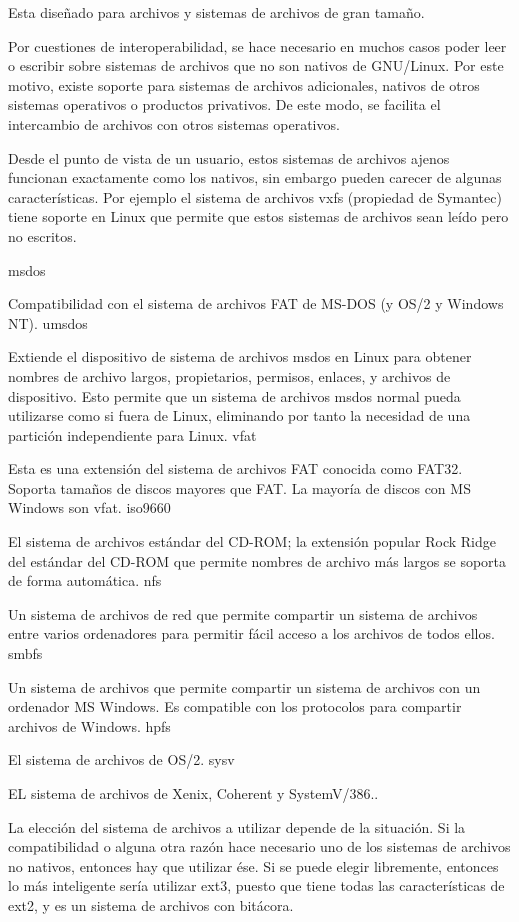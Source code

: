 \documentclass[12pt]{article}
\begin{document}
Esta diseñado para archivos y sistemas de archivos de gran tamaño.

Por cuestiones de interoperabilidad, se hace necesario en muchos casos
poder leer o escribir sobre sistemas de archivos que no son nativos de 
GNU/Linux. Por este motivo, existe soporte para sistemas de archivos 
adicionales, nativos de otros sistemas operativos o productos privativos. 
De este modo, se facilita el intercambio de archivos con otros sistemas 
operativos. 

Desde el punto de vista de un usuario, estos sistemas de archivos ajenos 
funcionan exactamente como los nativos, sin embargo pueden carecer de 
algunas características. Por ejemplo el sistema de archivos vxfs (propiedad
de Symantec) tiene soporte en Linux que permite que estos sistemas de 
archivos sean leído pero no escritos. 

msdos

    Compatibilidad con el sistema de archivos FAT de MS-DOS (y OS/2 y Windows NT).
umsdos

    Extiende el dispositivo de sistema de archivos msdos en Linux para obtener nombres de archivo largos, propietarios, permisos, enlaces, y archivos de dispositivo. Esto permite que un sistema de archivos msdos normal pueda utilizarse como si fuera de Linux, eliminando por tanto la necesidad de una partición independiente para Linux.
vfat

    Esta es una extensión del sistema de archivos FAT conocida como FAT32. Soporta tamaños de discos mayores que FAT. La mayoría de discos con MS Windows son vfat.
iso9660

    El sistema de archivos estándar del CD-ROM; la extensión popular Rock Ridge del estándar del CD-ROM que permite nombres de archivo más largos se soporta de forma automática.
nfs

    Un sistema de archivos de red que permite compartir un sistema de archivos entre varios ordenadores para permitir fácil acceso a los archivos de todos ellos.
smbfs

    Un sistema de archivos que permite compartir un sistema de archivos con un ordenador MS Windows. Es compatible con los protocolos para compartir archivos de Windows.
hpfs

    El sistema de archivos de OS/2.
sysv

    EL sistema de archivos de Xenix, Coherent y SystemV/386..

La elección del sistema de archivos a utilizar depende de la situación. Si la compatibilidad o alguna otra razón hace necesario uno de los sistemas de archivos no nativos, entonces hay que utilizar ése. Si se puede elegir libremente, entonces lo más inteligente sería utilizar ext3, puesto que tiene todas las características de ext2, y es un sistema de archivos con bitácora.
\end{document}
